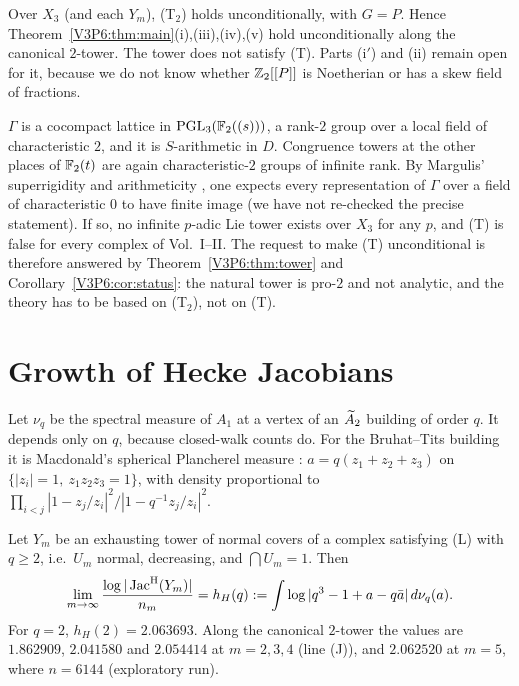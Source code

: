 \begin{corollary}\label{V3P6:cor:status}
Over $X_3$ (and each $Y_m$), (T$_2$) holds unconditionally, with $G=P$. Hence
Theorem~\ref{V3P6:thm:main}(i),(iii),(iv),(v) hold unconditionally along the canonical
$2$-tower. The tower does not satisfy (T). Parts (i$'$) and (ii) remain open for it, because we do
not know whether $\mathbb{Z}_2[[P]]$ is Noetherian or has a skew field of fractions.
\end{corollary}

\begin{remark}\label{V3P6:rem:analytic}
$\Gamma$ is a cocompact lattice in $\mathrm{PGL}_3(\mathbb{F}_2((s)))$, a rank-$2$ group over a local field of
characteristic $2$, and it is $S$-arithmetic in $D$. Congruence towers at the other places of
$\mathbb{F}_2(t)$ are again characteristic-$2$ groups of infinite rank. By Margulis' superrigidity and
arithmeticity \cite{Mar91}, one expects every representation of $\Gamma$ over a field of
characteristic $0$ to have finite image (we have not re-checked the precise statement). If so, no
infinite $p$-adic Lie tower exists over $X_3$ for any $p$, and (T) is false for every complex of
Vol.~I--II. The request to make (T) unconditional is therefore answered by
Theorem~\ref{V3P6:thm:tower} and Corollary~\ref{V3P6:cor:status}: the natural tower is pro-$2$
and not analytic, and the theory has to be based on (T$_2$), not on (T).
\end{remark}

\section{Growth of Hecke Jacobians}\label{V3P6:sec:growth}

Let $\nu_q$ be the spectral measure of $A_1$ at a vertex of an $\widetilde A_2$ building of order $q$. It
depends only on $q$, because closed-walk counts do. For the Bruhat--Tits building it is
Macdonald's spherical Plancherel measure \cite{Mac71}: $a=q(z_1+z_2+z_3)$ on
$\{|z_i|=1,\ z_1z_2z_3=1\}$, with density proportional to
$\prod_{i<j}|1-z_j/z_i|^{2}/|1-q^{-1}z_j/z_i|^{2}$.

\begin{theorem}\label{V3P6:thm:growth}
Let $Y_m$ be an exhausting tower of normal covers of a complex satisfying \textup{(L)} with $q\ge2$,
i.e.\ $U_m$ normal, decreasing, and $\bigcap U_m=1$. Then
\[
\lim_{m\to\infty}\frac{\log|\operatorname{Jac}^{\mathrm{H}}(Y_m)|}{n_m}=h_H(q):=\int\log|q^{3}-1+a-q\bar a|\,d\nu_q(a).
\]
For $q=2$, $h_H(2)=2.063693$. Along the canonical $2$-tower the values are $1.862909$,
$2.041580$ and $2.054414$ at $m=2,3,4$ (line (J)), and $2.062520$ at $m=5$, where $n=6144$
(exploratory run).
\end{theorem}

